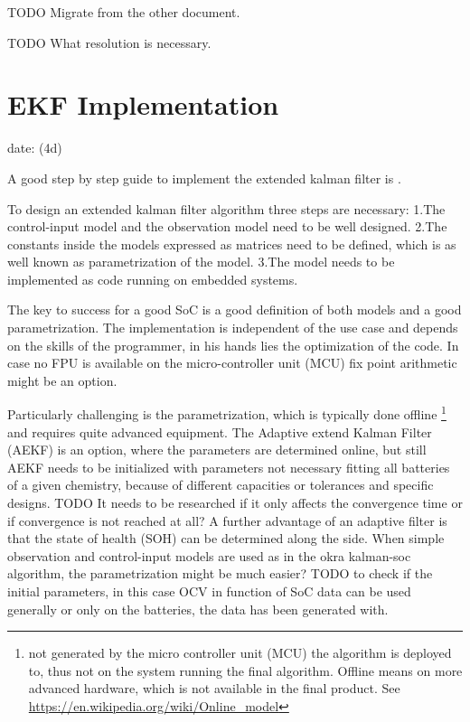 TODO Migrate from the other document.

TODO What resolution is necessary. 

\section{EKF Implementation}
date: (4d)

A good step by step guide to implement the extended kalman filter is \cite{rzepka2021implementing}.

To design an extended kalman filter algorithm three steps are necessary:
1.The control-input model and the observation model need to be well designed. 
2.The constants inside the models expressed as matrices need to be defined, which is as well known as parametrization of the model.  
3.The model needs to be implemented as code running on embedded systems. 

The key to success for a good SoC is a good definition of both models and a good parametrization. The implementation is independent of the use case and depends on the skills of the programmer, in his  hands lies the optimization of the  code. In case no FPU is available on the micro-controller unit (MCU) fix point arithmetic might be an option.  

Particularly challenging is the parametrization, which is typically done offline \footnote{not generated by the micro controller unit (MCU) the algorithm is deployed to, thus not on the system running the final algorithm. Offline means on more advanced hardware, which is not available in the final product. See \url{https://en.wikipedia.org/wiki/Online_model} } and requires quite advanced equipment. The Adaptive extend Kalman Filter (AEKF) is an option, where the parameters are determined online, but still AEKF needs to be initialized with parameters not necessary fitting all batteries of a given chemistry, because of different capacities or tolerances and specific designs. 
TODO It needs to be researched if it only affects the convergence time or if convergence is not reached at all? A further advantage of an adaptive filter is that the state of health (SOH) can be determined along the side. 
When simple observation and control-input models are used as in the okra kalman-soc algorithm, the parametrization might be much easier?
TODO to check if the initial parameters, in this case OCV in function of SoC data can be used generally or only on the batteries, the data has been generated with. \\

